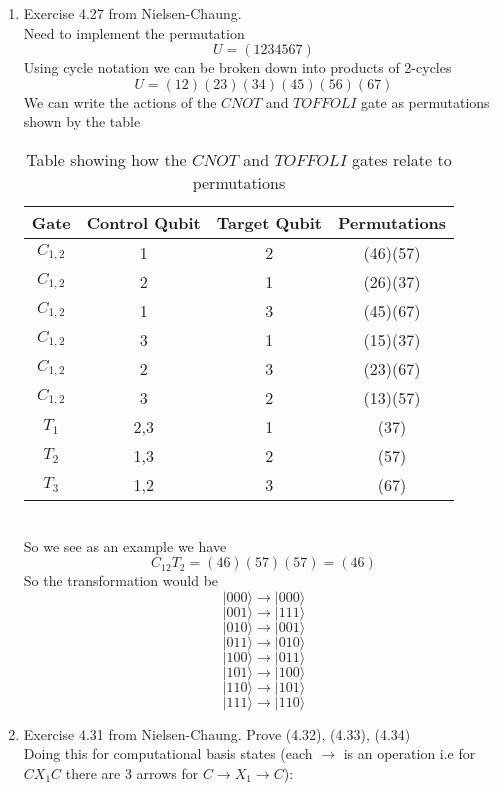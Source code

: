 \documentclass[12pt]{article}
\newcommand{\ket}[1]{\vert{#1}\rangle}
\begin{document}
\begin{enumerate}
    \item Exercise 4.27 from Nielsen-Chaung.
    \\
    Need to implement the permutation 
    $$ U = (1234567) $$ 
    Using cycle notation we can be broken down into products of 2-cycles 
    $$ U = (12)(23)(34)(45)(56)(67) $$
    We can write the actions of the $CNOT$ and $TOFFOLI$ gate as permutations shown by the table 
    \begin{table}[h]
        \centering
        \begin{tabular}{|c|c|c|c|}
        \hline
        Gate      & Control Qubit & Target Qubit & Permutations \\ \hline
        $C_{1,2}$ & 1             & 2            & (46)(57)     \\ \hline
        $C_{1,2}$ & 2             & 1            & (26)(37)     \\ \hline
        $C_{1,2}$ & 1             & 3            & (45)(67)     \\ \hline
        $C_{1,2}$ & 3             & 1            & (15)(37)     \\ \hline
        $C_{1,2}$ & 2             & 3            & (23)(67)     \\ \hline
        $C_{1,2}$ & 3             & 2            & (13)(57)     \\ \hline
        $T_1$     & 2,3           & 1            & (37)         \\ \hline
        $T_2$     & 1,3           & 2            & (57)         \\ \hline
        $T_3$     & 1,2           & 3            & (67)         \\ \hline
        \end{tabular}
        \caption{Table showing how the $CNOT$ and $TOFFOLI$ gates relate to permutations}
        \label{tab1}
        \end{table}
    \\

    So we see as an example we have 
    $$ C_{12} T_2 = (46)(57)(57) = (46) $$
    So the transformation would be 
    $$ \ket{000} \rightarrow \ket{000} $$
    $$ \ket{001} \rightarrow \ket{111} $$
    $$ \ket{010} \rightarrow \ket{001} $$
    $$ \ket{011} \rightarrow \ket{010} $$
    $$ \ket{100} \rightarrow \ket{011} $$
    $$ \ket{101} \rightarrow \ket{100} $$
    $$ \ket{110} \rightarrow \ket{101} $$
    $$ \ket{111} \rightarrow \ket{110} $$ 
   

    \item Exercise 4.31 from Nielsen-Chaung. Prove (4.32), (4.33), (4.34)
    \\
    Doing this for computational basis states (each $\rightarrow$ is an operation i.e for $C X_1 C$ there are 3 arrows for $C \rightarrow X_1 \rightarrow C$):\\
    \begin{enumerate}


\end{enumerate}
\end{enumerate}
\end{document}
